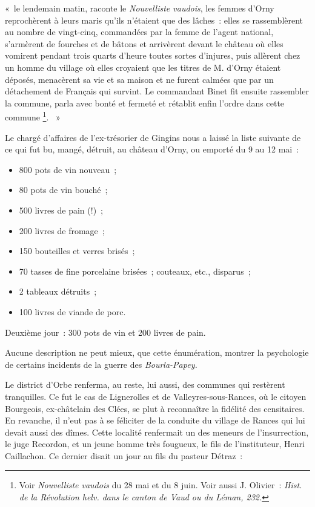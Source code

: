 \documentclass[french,twoside]{book} %
\newenvironment{quoteblock}%
  {\begin{quoting}}
  {\end{quoting}}
\newenvironment{quotebar}{%
    \def\FrameCommand{{\color{rubric!10!}\vrule width 0.5em} \hspace{0.9em}}%
    \def\OuterFrameSep{\itemsep} %
    \MakeFramed {\advance\hsize-\width \FrameRestore}
  }%
  {%
    \endMakeFramed
  }
\renewenvironment{quoteblock}%
  {%
    \savenotes
    \setstretch{0.9}
    \normalfont
    \begin{quotebar}
  }
  {%
    \end{quotebar}
    \spewnotes
  }
\begin{document}
\begin{quoteblock}
\noindent « le lendemain matin, raconte le \emph{Nouvelliste vaudois}, les femmes d’Orny reprochèrent à leurs maris qu’ils n’étaient que des lâches : elles se rassemblèrent au nombre de vingt-cinq, commandées par la femme de l’agent national, s’armèrent de fourches et de bâtons et arrivèrent devant le château où elles vomirent pendant trois quarts d’heure toutes sortes d’injures, puis allèrent chez un homme du village où elles croyaient que les titres de M. d’Orny étaient déposés, menacèrent sa vie et sa maison et ne furent calmées que par un détachement de Français qui survint. Le commandant Binet fit ensuite rassembler la commune, parla avec bonté et fermeté et rétablit enfin l’ordre dans cette commune \footnote{Voir \emph{Nouvelliste vaudois} du 28 mai et du 8 juin. Voir aussi J. Olivier : \emph{Hist. de la Révolution helv. dans le canton de Vaud ou du Léman, 232.}}.  »\end{quoteblock}

\noindent Le chargé d’affaires de l’ex-trésorier de Gingins nous a laissé la liste suivante de ce qui fut bu, mangé, détruit, au château d’Orny, ou emporté du 9 au 12 mai :\par

\begin{itemize}[itemsep=0pt,]
\item 800 pots de vin nouveau ;
\item 80 pots de vin bouché ;
\item 500 livres de pain (!) ;
\item 200 livres de fromage ;
\item 150 bouteilles et verres brisés ;
\item 70 tasses de fine porcelaine brisées ; couteaux, etc., disparus ;
\item 2 tableaux détruits ;
\item 100 livres de viande de porc.
\end{itemize}
\noindent Deuxième jour : 300 pots de vin et 200 livres de pain.\par
Aucune description ne peut mieux, que cette énumération, montrer la psychologie de certains incidents de la guerre des \emph{Bourla-Papey.}\par
Le district d’Orbe renferma, au reste, lui aussi, des communes qui restèrent tranquilles. Ce fut le cas de Lignerolles et de Valleyres-sous-Rances, où le citoyen Bourgeois, ex-châtelain des Clées, se plut à reconnaître la fidélité des censitaires. En revanche, il n’eut pas à se féliciter de la conduite du village de Rances qui lui devait aussi des dîmes. Cette localité renfermait un des meneurs de l’insurrection, le juge Recordon, et un jeune homme très fougueux, le fils de l’instituteur, Henri Caillachon. Ce dernier disait un jour au fils du pasteur Détraz :\par
\end{document}
